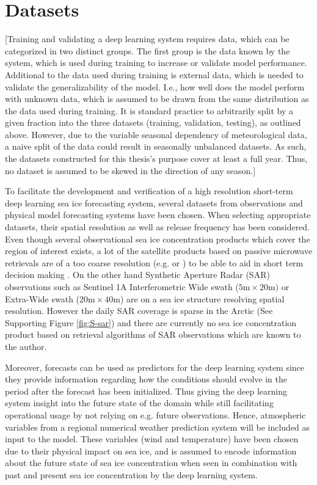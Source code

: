 \documentclass[../main/thesis.tex]{subfiles}
\begin{document}
\section{Datasets}
[Training and validating a deep learning system requires data, which can be categorized in two distinct groups. The first group is the data known by the system, which is used during training to increase or validate model performance. Additional to the data used during training is external data, which is needed to validate the generalizability of the model. I.e., how well does the model perform with unknown data, which is assumed to be drawn from the same distribution as the data used during training. It is standard practice to arbitrarily split by a given fraction into the three datasets (training, validation, testing), as outlined above. However, due to the variable seasonal dependency of meteorological data, a naive split of the data could result in seasonally unbalanced datasets. As such, the datasets constructed for this thesis's purpose cover at least a full year. Thus, no dataset is assumed to be skewed in the direction of any season.] 

To facilitate the development and verification of a high resolution short-term deep learning sea ice forecasting system, several datasets from observations and physical model forecasting systems have been chosen. When selecting appropriate datasets, their spatial resolution as well as release frequency has been considered. Even though several observational sea ice concentration products which cover the region of interest exists, a lot of the satellite products based on passive microwave retrievals are of a too coarse resolution (e.g. \citet{Lavergne2019} or \citet{Kern2019}) to be able to aid in short term decision making \citep{Wagner2020}. On the other hand Synthetic Aperture Radar (SAR) observations such as Sentinel 1A Interferometric Wide swath ($5\text{m} \times 20\text{m})$ or Extra-Wide swath ($20\text{m} \times 40\text{m}$) are on a sea ice structure resolving spatial resolution. However the daily SAR coverage is sparse in the Arctic (See Supporting Figure \ref{fig:S-sar}) and there are currently no sea ice concentration product based on retrieval algorithms of SAR observations which are known to the author.

Moreover, forecasts can be used as predictors for the deep learning system since they provide information regarding how the conditions should evolve in the period after the forecast has been initialized. Thus giving the deep learning system insight into the future state of the domain while still facilitating operational usage by not relying on e.g. future observations. Hence, atmospheric variables from a regional numerical weather prediction system will be included as input to the model. These variables (wind and temperature) have been chosen due to their physical impact on sea ice, and is assumed to encode information about the future state of sea ice concentration when seen in combination with past and present sea ice concentration by the deep learning system.
\end{document}
